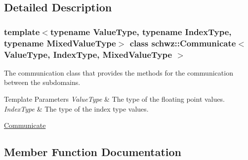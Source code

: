 \subsection{Detailed Description}
\subsubsection*{template$<$typename Value\+Type, typename Index\+Type, typename Mixed\+Value\+Type$>$\newline
class schwz\+::\+Communicate$<$ Value\+Type, Index\+Type, Mixed\+Value\+Type $>$}

The communication class that provides the methods for the communication between the subdomains. 


\begin{DoxyTemplParams}{Template Parameters}
{\em Value\+Type} & The type of the floating point values. \\
\hline
{\em Index\+Type} & The type of the index type values.\\
\hline
\end{DoxyTemplParams}
\hyperlink{group__comm}{Communicate} 

\subsection{Member Function Documentation}
\mbox{\label{classschwz_1_1Communicate_ac2a1e0aae9a645a1733e4f1e47cdd691}} 
